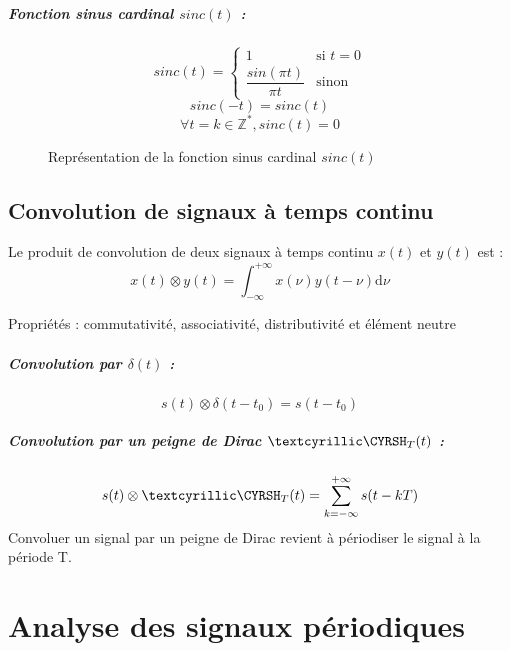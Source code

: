 \documentclass[a4paper,12pt]{report}
\begin{document}
\paragraph{Fonction sinus cardinal $sinc(t)$ :}

\[ sinc(t) =
\begin{cases}
    1 & \text{si } t = 0 \\
    \dfrac{sin(\pi t)}{\pi t} & \text{sinon}
\end{cases} \]
\[ sinc(-t) = sinc(t) \]
\[ \forall t = k \in \mathbb{Z}^{*}, sinc(t) = 0 \]

\begin{figure}[!htbp]
	\centering
	\caption{Représentation de la fonction sinus cardinal $sinc(t)$}
\end{figure}

\section{Convolution de signaux à temps continu}

Le produit de convolution de deux signaux à temps continu $x(t)$ et $y(t)$ est :
\[ x(t) \otimes y(t) = \int_{-\infty}^{+\infty} x(\nu)y(t-\nu) \mathrm{d}\nu \]

Propriétés : commutativité, associativité, distributivité et élément neutre

\paragraph{Convolution par $\delta(t)$ :}
\[ s(t) \otimes \delta(t-t_{0}) = s(t-t_{0}) \]

\paragraph{Convolution par un peigne de Dirac $\dirac_{T}(t)$ :}
\[ s(t) \otimes \dirac_{T}(t) = \sum_{k=-\infty}^{+\infty} s(t-kT) \]
Convoluer un signal par un peigne de Dirac revient à périodiser le signal à la période T.

\chapter{Analyse des signaux périodiques}
\end{document}
